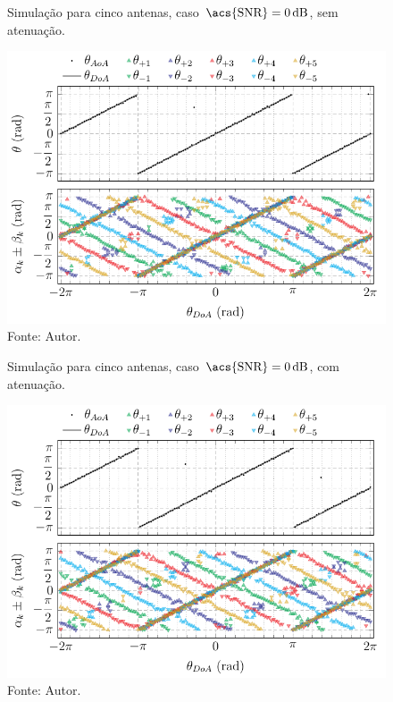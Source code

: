 \begin{figure}[H]
    \centering
    \caption{Simulação para cinco antenas, caso $\text{\acs{SNR}} = \SI{0}{\deci\bel}$, sem atenuação.}
    \label{fig:simul_POLY_5_R_50_SNR_1}
    \includegraphics{../pictures/simul_POLY_5_R_50_SNR_1.pdf}
    \caption*{Fonte: Autor.}
\end{figure}

\begin{figure}[H]
    \centering
    \caption{Simulação para cinco antenas, caso $\text{\acs{SNR}} = \SI{0}{\deci\bel}$, com atenuação.}
    \label{fig:simul_POLY_5_R_50_SNR_1_ATT}
    \includegraphics{../pictures/simul_POLY_5_R_50_SNR_1_ATT.pdf}
    \caption*{Fonte: Autor.}
\end{figure}

